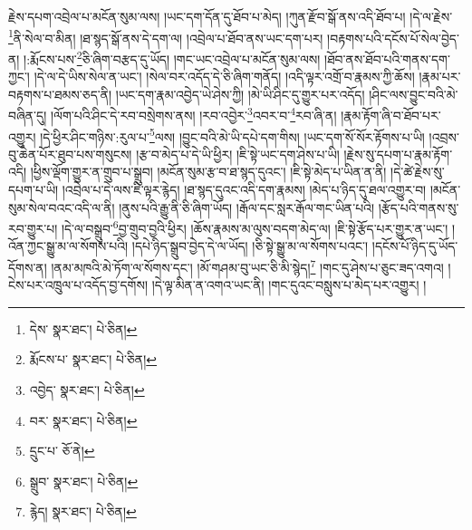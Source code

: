 རྗེས་དཔག་འབྲེལ་པ་མངོན་སུམ་ལས། །ཡང་དག་དོན་དུ་ཐོབ་པ་མེད། །ཀུན་རྫོབ་སྒོ་ནས་འདི་ཐོབ་པ། །དེ་ལ་རྗེས་\footnote{དེས་  སྣར་ཐང་།  པེ་ཅིན། }ནི་སེལ་བ་མིན། །ཐ་སྙད་སྒོ་ནས་དེ་དག་ལ། །འབྲེལ་པ་ཐོབ་ནས་ཡང་དག་པར། །བརྟགས་པའི་དངོས་པོ་སེལ་བྱེད་ན། །:རྨོངས་པས་\footnote{རྨོངས་པ་  སྣར་ཐང་།  པེ་ཅིན། }ཅི་ཞིག་བརྩད་དུ་ཡོད། །གང་ཡང་འབྲེལ་པ་མངོན་སུམ་ལས། །ཐོབ་ནས་ཐོབ་པའི་གནས་དག་ཀྱང་། །དེ་ལ་དེ་ཡིས་སེལ་ན་ཡང་། །སེལ་བར་འདོད་དེ་ཅི་ཞིག་གནོད། །འདི་ལྟར་འགྲོ་བ་རྣམས་ཀྱི་ཆོས། །རྣམ་པར་བརྟགས་པ་ཐམས་ཅད་ནི། །ཡང་དག་རྣམ་འབྱེད་ཡེ་ཤེས་ཀྱི། །མེ་ཡི་ཤིང་དུ་གྱུར་པར་འདོད། །ཤིང་ལས་བྱུང་བའི་མེ་བཞིན་དུ། །ལོག་པའི་ཤིང་དེ་རབ་བསྲེགས་ནས། །རབ་འབྱེར་\footnote{འབྱེད་  སྣར་ཐང་།  པེ་ཅིན། }འབར་བ་\footnote{བར་  སྣར་ཐང་།  པེ་ཅིན། }རབ་ཞི་ན། །རྣམ་རྟོག་ཞི་བ་ཐོབ་པར་འགྱུར། །དེ་ཕྱིར་ཤིང་གཉིས་:རུལ་པ་\footnote{དྲུང་པ་  ཅོ་ནེ། }ལས། །བྱུང་བའི་མེ་ཡི་དཔེ་དག་གིས། །ཡང་དག་སོ་སོར་རྟོགས་པ་ཡི། །འབྲས་བུ་ཆེན་པོར་ཐུབ་པས་གསུངས། །རྩ་བ་མེད་པ་དེ་ཡི་ཕྱིར། །ཇི་སྟེ་ཡང་དག་ཤེས་པ་ཡི། །རྗེས་སུ་དཔག་པ་རྣམ་རྟོག་འདི། །ཕྱིས་ལྡོག་གྱུར་ན་གྲུབ་པ་སྒྲུབ། །མངོན་སུམ་རྩ་བ་ཐ་སྙད་དུའང་། །ཇི་སྟེ་མེད་པ་ཡིན་ན་ནི། །དེ་ཚེ་རྗེས་སུ་དཔག་པ་ཡི། །འབྲེལ་པ་དེ་ལས་ཇི་ལྟར་རྙེད། །ཐ་སྙད་དུའང་འདི་དག་རྣམས། །མེད་པ་ཉིད་དུ་ཐལ་འགྱུར་བ། །མངོན་སུམ་སེལ་བའང་འདི་ལ་ནི། །ནུས་པའི་རྒྱུ་ནི་ཅི་ཞིག་ཡོད། །རྒོལ་དང་སླར་རྒོལ་གང་ཡིན་པའི། །རྩོད་པའི་གནས་སུ་རབ་གྱུར་པ། །དེ་ལ་བསྒྲུབ་\footnote{སྒྲུབ་  སྣར་ཐང་།  པེ་ཅིན། }བྱ་གྲུབ་བྱའི་ཕྱིར། །ཆོས་རྣམས་མ་ལུས་བདག་མེད་ལ། །ཇི་སྟེ་རྩོད་པར་གྱུར་ན་ཡང་། །འོན་ཀྱང་སྒྱུ་མ་ལ་སོགས་པའི། །དཔེ་ཉིད་སྒྲུབ་བྱེད་དེ་ལ་ཡོད། །ཅི་སྟེ་སྒྱུ་མ་ལ་སོགས་པའང་། །དངོས་པོ་ཉིད་དུ་ཡོད་དོགས་ན། །ནམ་མཁའི་མེ་ཏོག་ལ་སོགས་དང་། །མོ་གཤམ་བུ་ཡང་ཅི་མི་སྙེད།\footnote{རྙེད།  སྣར་ཐང་།  པེ་ཅིན། } །གང་དུ་ཤེས་པ་ཅུང་ཟད་འགའ། །ངེས་པར་འཁྲུལ་པ་འདོད་བྱ་དགོས། །དེ་ལྟ་མིན་ན་འགའ་ཡང་ནི། །གང་དུའང་བསླུས་པ་མེད་པར་འགྱུར། །
